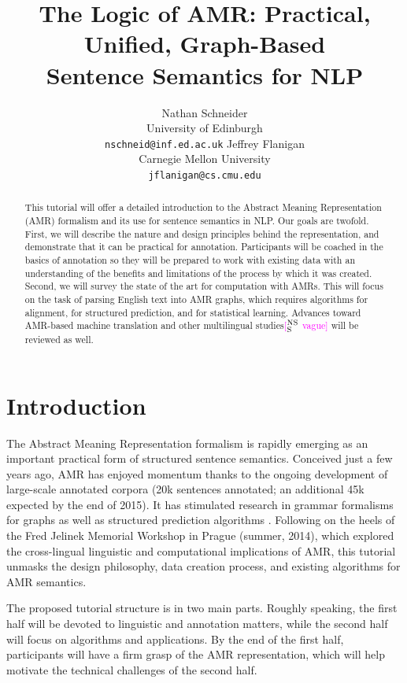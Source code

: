 \documentclass[11pt,letterpaper]{article}
\title{The Logic of AMR: Practical, Unified, Graph-Based\\ Sentence Semantics for NLP}
\author{Nathan Schneider\\
	University of Edinburgh\\
	{\tt nschneid@inf.ed.ac.uk}
\And
	Jeffrey Flanigan\\
	Carnegie Mellon University\\
	{\tt jflanigan@cs.cmu.edu}
	    }
\date{}
\newcommand{\ensuretext}[1]{#1}
\newcommand{\nssmarker}{\ensuretext{\textcolor{magenta}{\ensuremath{^{\textsc{NS}}_{\textsc{S}}}}}}
\newcommand{\arkcomment}[3]{\ensuretext{\textcolor{#3}{[#1 #2]}}}
\newcommand{\nss}[1]{\arkcomment{\nssmarker}{#1}{magenta}}
\begin{document}
\maketitle

\begin{abstract}
This tutorial will offer a detailed introduction to the Abstract Meaning Representation (AMR) formalism 
and its use for sentence semantics in NLP. Our goals are twofold. 
First, we will describe the nature and design principles behind the representation, 
and demonstrate that it can be practical for annotation. Participants will be coached in the basics of annotation 
so they will be prepared to work with existing data with an understanding of the benefits and limitations 
of the process by which it was created. 
Second, we will survey the state of the art for computation with AMRs. 
This will focus on the task of parsing English text into AMR graphs, which 
requires algorithms for alignment, for structured prediction, and for statistical learning. 
Advances toward AMR-based machine translation and other multilingual studies\nss{vague} will be reviewed as well.
\end{abstract}

\section{Introduction}

The Abstract Meaning Representation formalism \citep[AMR;][]{amr} 
is rapidly emerging as an important practical form of structured sentence semantics. 
Conceived just a few years ago, AMR has enjoyed momentum thanks to 
the ongoing development of large-scale annotated corpora 
(20k sentences annotated; an additional 45k expected by the end of 2015).
It has stimulated research in grammar formalisms for graphs \citep{jones-12,chiang-13,braune-14}
as well as structured prediction algorithms \citep{flanigan-14}.
Following on the heels of the Fred Jelinek Memorial Workshop in Prague (summer, 2014), 
which explored the cross-lingual linguistic and computational implications of AMR, 
this tutorial unmasks the design philosophy, data creation process, and existing algorithms for 
AMR semantics.

The proposed tutorial structure is in two main parts. 
Roughly speaking, the first half will be devoted to linguistic and annotation matters, 
while the second half will focus on algorithms and applications.
By the end of the first half, participants will have a firm grasp of the AMR representation, 
which will help motivate the technical challenges of the second half.
\end{document}
